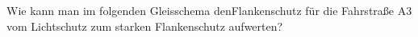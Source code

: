 

Wie kann man im folgenden Gleisschema denFlankenschutz für die Fahrstraße A3 vom Lichtschutz zum starken Flankenschutz aufwerten?

